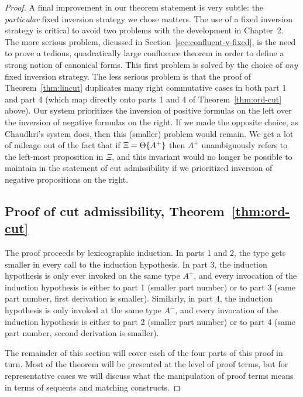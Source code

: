 \begin{proof}
A final improvement in our theorem statement is very subtle: the {\it
  particular} fixed inversion strategy we chose matters.  The use of a
fixed inversion strategy is critical to avoid two problems with the
development in Chapter~2. The more serious problem, dicussed in
Section~\ref{sec:confluent-v-fixed}, is the need to prove a tedious,
quadratically large confluence theorem in order to define a strong
notion of canonical forms. This first problem is solved by the choice
of {\it any} fixed inversion strategy. The less serious problem is
that the proof of Theorem~\ref{thm:lincut} duplicates many right
commutative cases in both part 1 and part 4 (which map directly onto
parts 1 and 4 of Theorem~\ref{thm:ord-cut} above). Our system
prioritizes the inversion of positive formulas on the left over the
inversion of negative formulas on the right. If we made the opposite
choice, as Chaudhri's system does, then this (smaller) problem 
would remain. We get a lot of mileage out of the
fact that if $\Xi = {\Theta}\{{A^+}\}$ then $A^+$ unambiguously
refers to the left-most proposition in $\Xi$, and this invariant would
no longer be possible to maintain in the statement of cut
admissibility if we prioritized inversion of negative propositions on
the right.


\subsection{Proof of cut admissibility, Theorem~\ref{thm:ord-cut}}

The proof proceeds by lexicographic induction.  In parts 1 and 2, the
type gets smaller in every call to the induction hypothesis. In part
3, the induction hypothesis is only ever invoked on the same type
$A^+$, and every invocation of the induction hypothesis is either to
part 1 (smaller part number) or to part 3 (same part number, first
derivation is smaller). Similarly, in part 4, the induction hypothesis
is only invoked at the same type $A^-$, and every invocation of the
induction hypothesis is either to part 2 (smaller part number) or to
part 4 (same part number, second derivation is smaller).

The remainder of this section will cover each of the four parts of
this proof in turn. Most of the theorem will be presented at the level
of proof terms, but for representative cases we will discuss what the
manipulation of proof terms means in terms of sequents and matching
constructs.


\end{proof}
